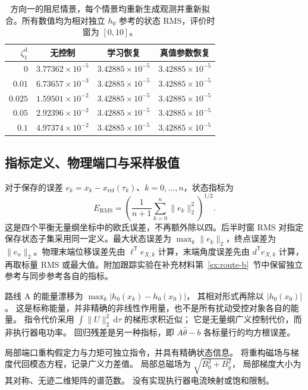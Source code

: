 \begin{table}[t]
\centering
\caption{方向一的阻尼情景，每个情景均重新生成观测并重新拟合。所有数值均为相对独立 $h_0$ 参考的状态 RMS，评价时窗为 $[0,10]$。}
\label{sx:framework-damping-a}
\begin{tabular}{rccc}
\toprule
$\zeta_1^{\mathrm d}$ & 无控制 & 学习恢复 & 真值参数恢复\\
\midrule
$0$ & $3.77362\times10^{-5}$ & $3.42885\times10^{-5}$ & $3.42885\times10^{-5}$ \\
$0.01$ & $6.73657\times10^{-3}$ & $3.42885\times10^{-5}$ & $3.42885\times10^{-5}$ \\
$0.025$ & $1.59501\times10^{-2}$ & $3.42885\times10^{-5}$ & $3.42885\times10^{-5}$ \\
$0.05$ & $2.92396\times10^{-2}$ & $3.42885\times10^{-5}$ & $3.42885\times10^{-5}$ \\
$0.1$ & $4.97374\times10^{-2}$ & $3.42885\times10^{-5}$ & $3.42885\times10^{-5}$ \\
\bottomrule
\end{tabular}
\end{table}

\subsection{指标定义、物理端口与采样极值}
\label{sx:metrics}
对于保存的误差 $e_k=x_k-x_{\mathrm{ref}}(\tau_k)$、$k=0,\ldots,n$，状态指标为
\begin{equation}
 E_{\mathrm{RMS}}=
 \left(\frac1{n+1}\sum_{k=0}^{n}\|e_k\|_2^2\right)^{1/2}.
 \label{sx:rms}
\end{equation}
这是四个平衡无量纲坐标中的欧氏误差，不再额外除以四。后半时窗 RMS 对指定保存状态子集采用同一定义。最大状态误差为 $\max_k\|e_k\|_2$，终点误差为 $\|e_n\|_2$。物理末端位移误差先由 $\ell^{\mathsf T}e_{X,k}$ 计算，末端角度误差先由 $d^{\mathsf T}e_{X,k}$ 计算，再取标量 RMS 或最大值。附加跟踪实验在补充材料第~\ref{sx:route-b}~节中保留独立参考与同步参考各自的指标。

路线 A 的能量漂移为 $\max_k|h_0(x_k)-h_0(x_0)|$，
其相对形式再除以 $|h_0(x_0)|$。
这是标称能量，并非精确的非线性作用量，也不是所有扰动受控对象各自的能量。
指令代价采用 $\int\|U\|_2^2\,\mathrm d\tau$ 的梯形求积近似；
它是无量纲广义控制代价，而非执行器电功率。
回归残差是另一种指标，即 $A\widehat\theta-b$ 各标量行的均方根误差。

局部端口重构假定力与力矩可独立指令，并具有精确状态信息。
将重构磁场与梯度代回模态方程，记录广义力差值。
局部总磁场为 $\sqrt{B_0^2+B_y^2}$，
局部梯度大小为其对称、无迹二维矩阵的谱范数。
没有实现执行器电流映射或饱和限制。

